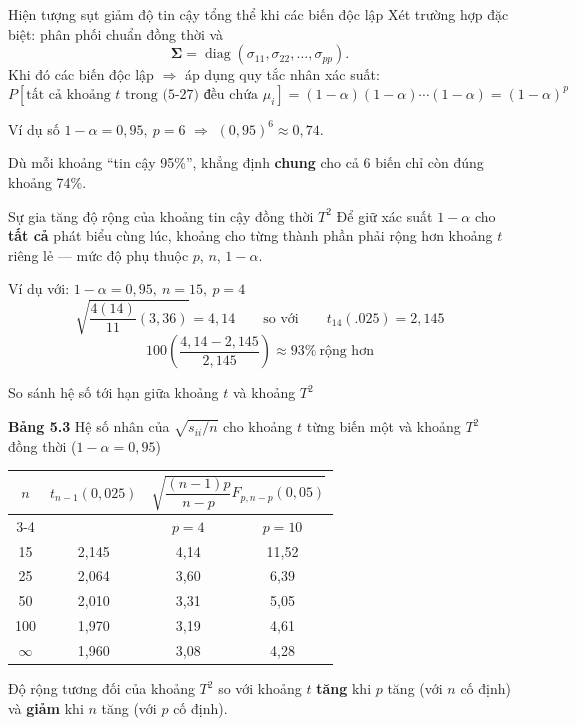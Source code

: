 \begin{frame}{Hiện tượng sụt giảm độ tin cậy tổng thể khi các biến độc lập}
Xét trường hợp đặc biệt: phân phối chuẩn đồng thời và
\[
\boldsymbol\Sigma=\operatorname{diag}(\sigma_{11},\sigma_{22},\ldots,\sigma_{pp}).
\]
Khi đó các biến độc lập $\Rightarrow$ áp dụng quy tắc nhân xác suất:
\[
P[\text{tất cả khoảng $t$ trong (5-27) đều chứa }\mu_i]
=(1-\alpha)(1-\alpha)\cdots(1-\alpha)=(1-\alpha)^p
\tag{$*6$}
\]

\begin{block}{Ví dụ số}
$1-\alpha=0{,}95,\ p=6$ $\Rightarrow$ $(0{,}95)^6\approx 0{,}74$.
\end{block}

Dù mỗi khoảng ``tin cậy 95\%'', khẳng định \textbf{chung} cho cả 6 biến chỉ còn
đúng khoảng 74\%.
\end{frame}

\begin{frame}{Sự gia tăng độ rộng của khoảng tin cậy đồng thời $T^2$}
Để giữ xác suất $1-\alpha$ cho \textbf{tất cả} phát biểu cùng lúc, khoảng cho
từng thành phần phải rộng hơn khoảng $t$ riêng lẻ — mức độ phụ thuộc $p$, $n$,
$1-\alpha$.

\begin{block}{Ví dụ với: $1-\alpha=0{,}95,\ n=15,\ p=4$}
\[
\sqrt{\frac{4(14)}{11}(3{,}36)}=4{,}14
\qquad\text{so với}\qquad
t_{14}(.025)=2{,}145
\]
\[
100\left(\frac{4{,}14-2{,}145}{2{,}145}\right)\approx 93\%\ \text{rộng hơn}
\]
\end{block}
\end{frame}

\begin{frame}{So sánh hệ số tới hạn giữa khoảng $t$ và khoảng $T^2$}
\centering
{\small\textbf{Bảng 5.3} Hệ số nhân của $\sqrt{s_{ii}/n}$ cho khoảng $t$ từng biến
một và khoảng $T^2$ đồng thời ($1-\alpha=0{,}95$)\par}
\vspace{0.4em}
\begin{tabular}{c c c c}
\toprule
$n$ & $t_{n-1}(0{,}025)$ & \multicolumn{2}{c}{$\sqrt{\dfrac{(n-1)p}{n-p}F_{p,n-p}(0{,}05)}$} \\
\cmidrule(lr){3-4}
 & & $p=4$ & $p=10$ \\
\midrule
15 & 2,145 & 4,14 & 11,52 \\
25 & 2,064 & 3,60 & 6,39 \\
50 & 2,010 & 3,31 & 5,05 \\
100 & 1,970 & 3,19 & 4,61 \\
$\infty$ & 1,960 & 3,08 & 4,28 \\
\bottomrule
\end{tabular}

\vspace{0.5em}
\footnotesize Độ rộng tương đối của khoảng $T^2$ so với khoảng $t$ \textbf{tăng}
khi $p$ tăng (với $n$ cố định) và \textbf{giảm} khi $n$ tăng (với $p$ cố định).
\end{frame}

